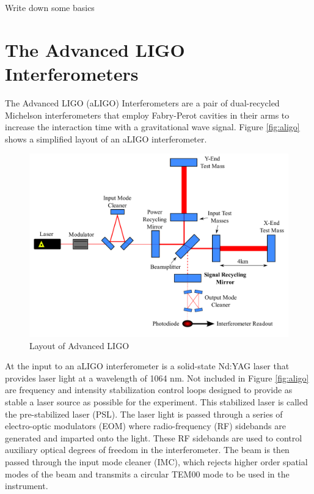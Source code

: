 Write down some basics

\section{The Advanced LIGO Interferometers}

The Advanced LIGO (aLIGO) Interferometers are a pair of dual-recycled Michelson interferometers 
that employ Fabry-Perot cavities in their arms to increase the interaction time with a 
gravitational wave signal. 
Figure \ref{fig:aligo} shows a simplified layout of an aLIGO interferometer. 


\begin{figure}[ht!]
\includegraphics[width=\textwidth]{figures/introduction/ALIGO_layout}
\caption[Layout of Advanced LIGO]{Layout of Advanced LIGO}
\end{figure}\label{fig:aligo}

At the input to an aLIGO interferometer is a solid-state Nd:YAG laser that provides laser light 
at a wavelength of 1064 nm. Not included in Figure \ref{fig:aligo} are frequency and 
intensity stabilization control loops designed to provide as stable a laser source as 
possible for the experiment. This stabilized laser is called the pre-stabilized laser 
(PSL). The laser light is passed through a series of 
electro-optic modulators (EOM) where radio-frequency (RF) sidebands are generated 
and imparted onto the light. These RF sidebands are used to control auxiliary optical 
degrees of freedom in the interferometer. The beam is then passed through the 
input mode cleaner (IMC), which rejects higher order spatial modes of the beam 
and transmits a circular TEM00 mode to be used in the instrument.

